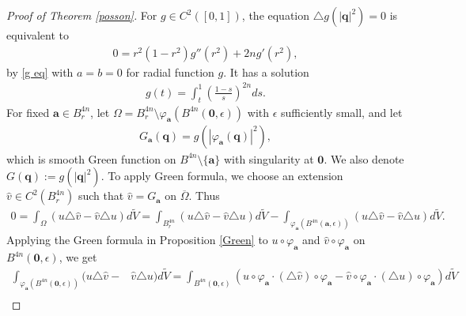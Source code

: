 \documentclass[10pt,a4paper]{amsart}
\begin{document}
\begin{proof}[Proof of Theorem \ref{posson}]
For $g\in C^2([0,1])$, the equation $\triangle g(|\mathbf{q}|^2)=0$ is equivalent to
\begin{equation}\begin{aligned}
0=r^2(1-r^2)g''(r^2)+2ng'(r^2),
\end{aligned}\end{equation}
by \eqref{g eq} with $a=b=0$ for radial function $g$. It has a solution
\begin{equation}\begin{aligned}\label{g}
g(t)=\int_{t}^{1}\left(\frac{1-s}{s}\right)^{2n}ds.
\end{aligned}\end{equation}
For fixed $\mathbf{a}\in B^{4n}_r$, let $\Omega=B_r^{4n} \setminus \varphi_{\mathbf{a}}(B^{4n}(\mathbf{0},\epsilon))$ with $\epsilon$ sufficiently small, and let
\begin{equation}\begin{aligned}\label{Ga}
G_{\mathbf{a}}(\mathbf{q})=g(|\varphi_{\mathbf{a}}(\mathbf{q})|^2),
\end{aligned}\end{equation}
which is smooth Green function on $B^{4n} \setminus \{\mathbf{a}\}$ with singularity at $\mathbf{0}$. We also denote $G(\mathbf{q}):=g(|\mathbf{q}|^2)$.
To apply Green formula, we choose an extension $\widehat{v}\in C^2(B_r^{4n})$ such that $\widehat{v}=G_{\mathbf{a}}$ on $\overline{\Omega}$.
Thus
\begin{equation}\begin{aligned}\label{total}
0=\int_{\Omega}(u\triangle \widehat{v}-\widehat{v}\triangle u) d\widetilde{V}=\int_{B^{4n}_r}(u\triangle \widehat{v}-\widehat{v}\triangle u) d\widetilde{V}-\int_{\varphi_{\mathbf{a}}(B^{4n}(\mathbf{a},\epsilon))}(u\triangle \widehat{v}-\widehat{v}\triangle u) d\widetilde{V}.
\end{aligned}\end{equation}
Applying the Green formula in Proposition \ref{Green} to $u\circ \varphi_{\mathbf{a}}$ and $\widehat{v}\circ \varphi_{\mathbf{a}}$ on $B^{4n}(\mathbf{0},\epsilon)$, we get
\begin{equation}\begin{aligned}\label{part ii}
\int_{\varphi_{\mathbf{a}}(B^{4n}(\mathbf{0},\epsilon))}(u\triangle\widehat{v}-&\widehat{v}\triangle u) d\widetilde{V}
=\int_{B^{4n}(\mathbf{0},\epsilon)}\left(u\circ\varphi_{\mathbf{a}}\cdot(\triangle \widehat{v})\circ\varphi_{\mathbf{a}}-\widehat{v}\circ\varphi_{\mathbf{a}}\cdot(\triangle u)\circ\varphi_{\mathbf{a}}\right) d\widetilde{V}\\

\end{aligned}
\end{equation}
\end{proof}
\end{document}
